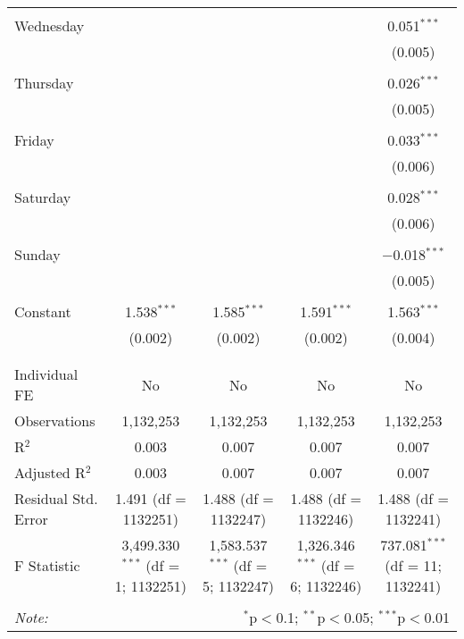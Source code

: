 \documentclass[
]{article}
\begin{document}
\begin{table}[!htbp]
{\begin{tabular}{@{\extracolsep{5pt}}lcccc}
  & & & & \\ 
 Wednesday &  &  &  & 0.051$^{***}$ \\ 
  &  &  &  & (0.005) \\ 
  & & & & \\ 
 Thursday &  &  &  & 0.026$^{***}$ \\ 
  &  &  &  & (0.005) \\ 
  & & & & \\ 
 Friday &  &  &  & 0.033$^{***}$ \\ 
  &  &  &  & (0.006) \\ 
  & & & & \\ 
 Saturday &  &  &  & 0.028$^{***}$ \\ 
  &  &  &  & (0.006) \\ 
  & & & & \\ 
 Sunday &  &  &  & $-$0.018$^{***}$ \\ 
  &  &  &  & (0.005) \\ 
  & & & & \\ 
 Constant & 1.538$^{***}$ & 1.585$^{***}$ & 1.591$^{***}$ & 1.563$^{***}$ \\ 
  & (0.002) & (0.002) & (0.002) & (0.004) \\ 
  & & & & \\ 
\hline \\[-1.8ex] 
Individual FE & No & No & No & No \\ 
Observations & 1,132,253 & 1,132,253 & 1,132,253 & 1,132,253 \\ 
R$^{2}$ & 0.003 & 0.007 & 0.007 & 0.007 \\ 
Adjusted R$^{2}$ & 0.003 & 0.007 & 0.007 & 0.007 \\ 
Residual Std. Error & 1.491 (df = 1132251) & 1.488 (df = 1132247) & 1.488 (df = 1132246) & 1.488 (df = 1132241) \\ 
F Statistic & 3,499.330$^{***}$ (df = 1; 1132251) & 1,583.537$^{***}$ (df = 5; 1132247) & 1,326.346$^{***}$ (df = 6; 1132246) & 737.081$^{***}$ (df = 11; 1132241) \\ 
\hline 
\hline \\[-1.8ex] 
\textit{Note:}  & \multicolumn{4}{r}{$^{*}$p$<$0.1; $^{**}$p$<$0.05; $^{***}$p$<$0.01} \\ 
\end{tabular}
} 
\end{table} 
\newpage
\end{document}
